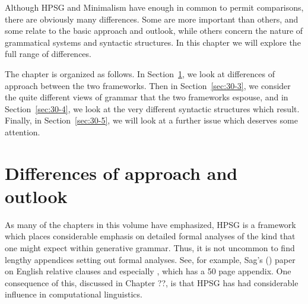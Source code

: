 \documentclass[output=paper]{langsci/langscibook}
\begin{document}
Although HPSG and Minimalism have enough in common to permit comparisons, there are obviously many differences. Some are more important than others, and some relate to the basic approach and outlook, while others concern the nature of grammatical systems and syntactic structures. In this chapter we will explore the full range of differences.

The chapter is organized as follows. In Section~\ref{sec:30-2}, we look at differences of approach between the two frameworks. Then in Section~\ref{sec:30-3}, we consider the quite different views of grammar that the two frameworks espouse, and in Section~\ref{sec:30-4}, we look at the very different syntactic structures which result. Finally, in Section~\ref{sec:30-5}, we will look at a further issue which deserves some attention.

\section{Differences of approach and outlook}
\label{sec:30-2}
As many of the chapters in this volume have emphasized, HPSG is a framework which places considerable emphasis on detailed formal analyses of the kind that one might expect within generative grammar. Thus, it is not uncommon to find lengthy appendices setting out formal analyses. See, for example, Sag's (\citeyear{Sag97a}) paper on English relative clauses and especially \citet{GSag2000a-u}, which has a 50 page appendix. One consequence of this, discussed in Chapter ??, is that HPSG has had considerable influence in computational linguistics.
\end{document}
